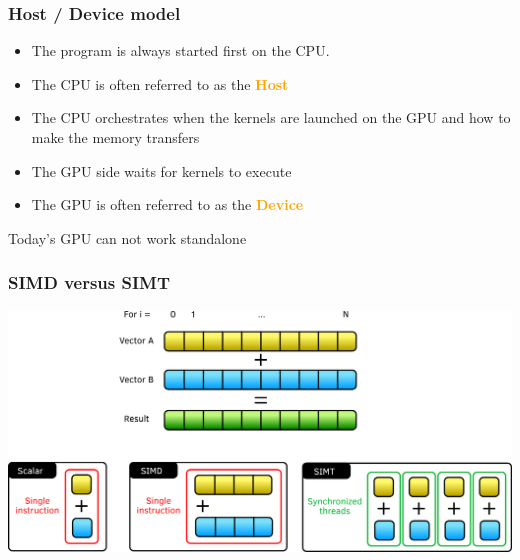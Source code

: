 \documentclass[aspectratio=169]{beamer}
\newcommand{\highlight}[1]{\textcolor{orange}{\textbf{#1}}}
\begin{document}

\begin{frame}
    \frametitle{Host / Device model}

    \begin{itemize}
        \item The program is always started first on the CPU.
        \item The CPU is often referred to as the \highlight{Host}
        \item The CPU orchestrates when the kernels are launched on the GPU and how to make the memory transfers
        \item The GPU side waits for kernels to execute
        \item The GPU is often referred to as the \highlight{Device}
    \end{itemize}

    \begin{alertblock}{}
        Today's GPU can not work standalone
    \end{alertblock}

\end{frame}


\begin{frame}
    \frametitle{SIMD versus SIMT}

    \begin{center}
        \includegraphics[width=\textwidth]{../../images/SIMD_vs_SIMT.png}
    \end{center}

\end{frame}

\end{document}
